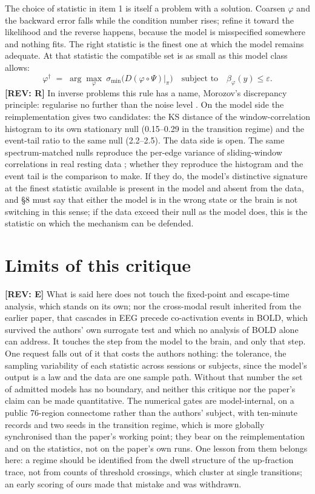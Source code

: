 \documentclass[11pt]{article}
\newcommand{\REV}[1]{\textcolor{purple!70!black}{\textbf{[REV: #1]}}}
\begin{document}
The choice of statistic in item 1 is itself a problem with a solution. Coarsen $\varphi$ and the backward error falls while the condition number rises; refine it toward the likelihood and the reverse happens, because the model is misspecified somewhere and nothing fits. The right statistic is the finest one at which the model remains adequate. At that statistic the compatible set is as small as this model class allows:
\begin{equation}
\varphi^{\dagger}\;=\;\arg\max_{\varphi}\ \sigma_{\min}\!\bigl(D(\varphi\circ\Psi)\big|_{\pi}\bigr)
\quad\text{subject to}\quad \beta_{\varphi}(y)\le\varepsilon .
\label{eq:design}
\end{equation}
\REV{R} In inverse problems this rule has a name, Morozov's discrepancy principle: regularise no further than the noise level \parencite{engl1996}. On the model side the reimplementation gives two candidates: the KS distance of the window-correlation histogram to its own stationary null (0.15--0.29 in the transition regime) and the event-tail ratio to the same null (2.2--2.5). The data side is open. The same spectrum-matched nulls reproduce the per-edge variance of sliding-window correlations in real resting data \parencite{liegeois2017}; whether they reproduce the histogram and the event tail is the comparison to make. If they do, the model's distinctive signature at the finest statistic available is present in the model and absent from the data, and \S8 must say that either the model is in the wrong state or the brain is not switching in this sense; if the data exceed their null as the model does, this is the statistic on which the mechanism can be defended.

\section{Limits of this critique}
\REV{E} What is said here does not touch the fixed-point and escape-time analysis, which stands on its own; nor the cross-modal result inherited from the earlier paper, that cascades in EEG precede co-activation events in BOLD, which survived the authors' own surrogate test \parencite{rabuffo2021} and which no analysis of BOLD alone can address. It touches the step from the model to the brain, and only that step. One request falls out of it that costs the authors nothing: the tolerance, the sampling variability of each statistic across sessions or subjects, since the model's output is a law and the data are one sample path. Without that number the set of admitted models has no boundary, and neither this critique nor the paper's claim can be made quantitative. The numerical gates are model-internal, on a public 76-region connectome rather than the authors' subject, with ten-minute records and two seeds in the transition regime, which is more globally synchronised than the paper's working point; they bear on the reimplementation and on the statistics, not on the paper's own runs. One lesson from them belongs here: a regime should be identified from the dwell structure of the up-fraction trace, not from counts of threshold crossings, which cluster at single transitions; an early scoring of ours made that mistake and was withdrawn.
\end{document}
